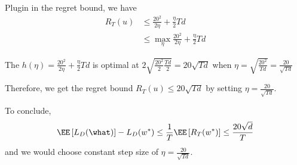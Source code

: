 Plugin in the regret bound, we have
\begin{align*}
  R_T(u)
  &\le \frac{20^2}{2\eta} + \frac{\eta}{2} Td \\
  &\le \max_{\eta} \frac{20^2}{2\eta} + \frac{\eta}{2} Td
\end{align*}

The $h(\eta) = \frac{20^2}{2\eta} + \frac{\eta}{2} Td$ is optimal at $2\sqrt{\frac{20^2}{2}\frac{Td}{2}} = 20\sqrt{Td}$ when $\eta = \sqrt{\frac{20^2}{Td}} = \frac{20}{\sqrt{Td}}$

Therefore, we get the regret bound $R_T(u) \le 20\sqrt{Td}$ by setting $\eta = \frac{20}{\sqrt{Td}}$.

To conclude,
\begin{align*}
  \EE\left[L_D(\what)\right] - L_D(w^*) \le \frac{1}{T} \EE\left[ R_T(w^*) \right] \le \frac{20\sqrt{d}}{T}
\end{align*}
and we would choose constant step size of $\eta = \frac{20}{\sqrt{Td}}$.